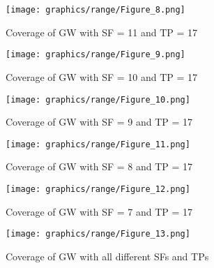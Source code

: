 \begin{figure}[H]
    \centering
      \texttt{[image: graphics/range/Figure\_8.png]}
      \caption{Coverage of GW with SF = 11 and TP = 17}
      \label{fig:fig8}
\end{figure}

\begin{figure}[H]
    \centering
      \texttt{[image: graphics/range/Figure\_9.png]}
      \caption{Coverage of GW with SF = 10 and TP = 17}
      \label{fig:fig9}
\end{figure}

\begin{figure}[H]
    \centering
      \texttt{[image: graphics/range/Figure\_10.png]}
      \caption{Coverage of GW with SF = 9 and TP = 17}
      \label{fig:fig10}
\end{figure}

\begin{figure}[H]
    \centering
      \texttt{[image: graphics/range/Figure\_11.png]}
      \caption{Coverage of GW with SF = 8 and TP = 17}
      \label{fig:fig11}
\end{figure}

\begin{figure}[H]
    \centering
      \texttt{[image: graphics/range/Figure\_12.png]}
      \caption{Coverage of GW with SF = 7 and TP = 17}
      \label{fig:fig12}
\end{figure}

\begin{figure}[H]
    \centering
      \texttt{[image: graphics/range/Figure\_13.png]}
      \caption{Coverage of GW with all different SFs and TPs}
      \label{fig:fig13}
\end{figure}